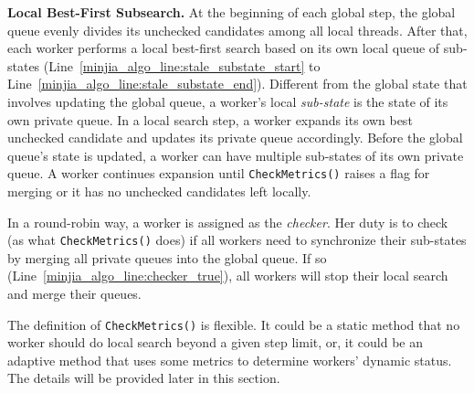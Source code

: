 \noindent\textbf{Local Best-First Subsearch.}
At the beginning of each global step, the global queue evenly divides its unchecked candidates among all local threads.
After that, each worker performs a local best-first search based on its own local queue of sub-states (Line~\ref{minjia_algo_line:stale_substate_start} to Line~\ref{minjia_algo_line:stale_substate_end}).
Different from the global state that involves updating the global queue, a worker's local \emph{sub-state} is the state of its own private queue.
In a local search step, a worker expands its own best unchecked candidate and updates its private queue accordingly.
Before the global queue's state is updated, a worker can have multiple sub-states of its own private queue.
A worker continues expansion until \texttt{CheckMetrics()} raises a flag for merging
or it has no unchecked candidates left locally.

In a round-robin way, a worker is assigned as the \emph{checker}. 
Her duty is to check (as what \texttt{CheckMetrics()} does) if all workers need to synchronize their sub-states by merging all private queues into the global queue.
If so (Line~\ref{minjia_algo_line:checker_true}), all workers will stop their local search and merge their queues.

The definition of \texttt{CheckMetrics()} is flexible. 
It could be a static method that no worker should do local search beyond a given step limit, or, it could be an adaptive method that uses some metrics to determine workers' dynamic status.
The details will be provided later in this section.





